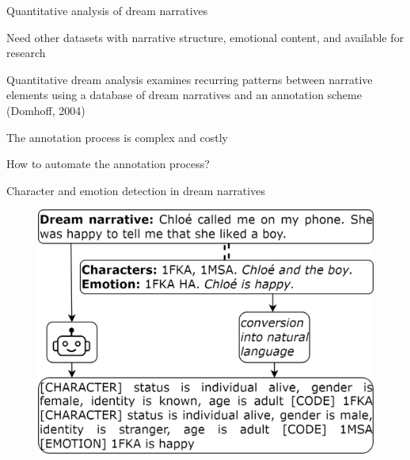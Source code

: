 \documentclass[handout,10pt]{beamer}
\begin{document}
\begin{frame}{Quantitative analysis of dream narratives}

Need other datasets with narrative structure, emotional content, and available for research

\vspace{0.5cm}
\pause

Quantitative dream analysis examines recurring patterns between narrative elements using a database of dream narratives and an annotation scheme (Domhoff, 2004)

\vspace{0.5cm}
\pause

The annotation process is complex and costly

\vspace{0.5cm}
\pause

How to automate the annotation process?

    
\end{frame}

\begin{frame}{Character and emotion detection in dream narratives}



\begin{figure}
    \centering
    \includegraphics[width=0.8\linewidth]{img/dream_method.png}
    \label{fig:placeholder}
\end{figure}


    
\end{frame}
\end{document}
